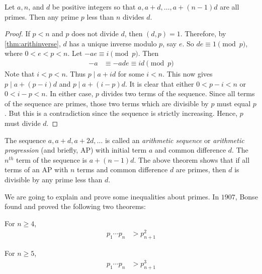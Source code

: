 \documentclass{subfiles}
\begin{document}
	\begin{theorem}
		Let $a,n$, and $d$ be positive integers so that $a,a+d,\ldots,a+(n-1)d$ are all primes. Then any prime $p$ less than $n$ divides $d$.
	\end{theorem}

	\begin{proof}
		If $p<n$ and $p$ does not divide $d$, then $(d,p)=1$. Therefore, by \autoref{thm:arithinverse}, $d$ has a unique inverse modulo $p$, say $e$. So $de\equiv1\pmod p$, where $0<e<p<n$. Let $-ae \equiv i \pmod p$. Then
			\begin{align*}
				-a & \equiv -ade \equiv id \pmod p
			\end{align*}
		Note that $i<p<n$. Thus $p\mid a+id$ for some $i<n$. This now gives $p\mid a+(p-i)d$ and $p\mid a+(i-p)d$. It is clear that either $0<p-i<n$ or $0<i-p<n$. In either case, $p$ divides two terms of the sequence. Since all terms of the sequence are primes, those two terms which are divisible by $p$ must equal $p$. But this is a contradiction since the sequence is strictly increasing. Hence, $p$ must divide $d$.
	\end{proof}

	\begin{remark}
		The sequence $a, a+d, a+2d, \ldots$ is called an \textit{arithmetic sequence} or \textit{arithmetic progression} (and briefly, AP) with initial term $a$ and common difference $d$. The $n^{th}$ term of the sequence is $a+(n-1)d$. The above theorem shows that if all terms of an AP with $n$ terms and common difference $d$ are primes, then $d$ is divisible by any prime less than $d$.
	\end{remark}

	We are going to explain and prove some inequalities about primes. In $1907$, Bonse found and proved the following two theorems:
	\begin{theorem}\label{thm:bonse1}
		For $n\geq 4$,
			\begin{align*}
				p_1\cdots p_n
					& >p_{n+1}^2
			\end{align*}
	\end{theorem}

	\begin{theorem}\label{thm:bonse2}
		For $n \geq 5$,
			\begin{align*}
				p_1\cdots p_n
					& >p_{n+1}^3
			\end{align*}
	\end{theorem}
\end{document}
